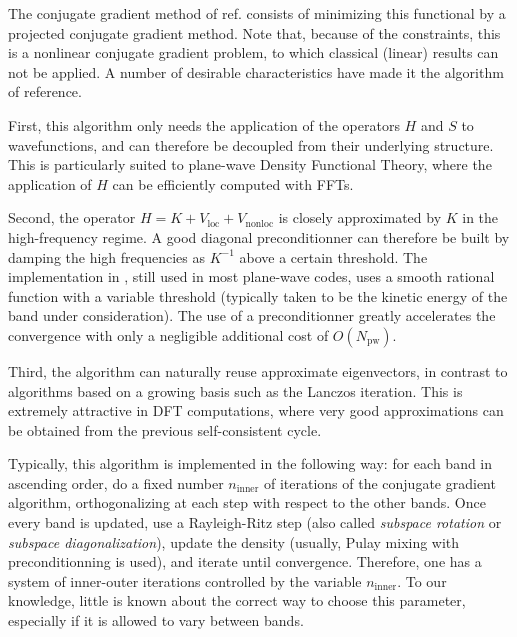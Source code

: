 \documentclass[11pt]{elsarticle}
\newcommand{\npw}{\ensuremath{N_{\text{pw}}}\xspace}
\newcommand{\nline}{\ensuremath{n_{\text{inner}}}\xspace}
\begin{document}
The conjugate gradient method of ref. \cite{payne1992iterative,
  kresse1996efficient} consists of minimizing this functional by a
projected conjugate gradient method. Note that, because of the
constraints, this is a nonlinear conjugate gradient problem, to which
classical (linear) results can not be applied. A number of desirable
characteristics have made it the algorithm of reference.

First, this algorithm only needs the application of the operators $H$
and $S$ to wavefunctions, and can therefore be decoupled from their
underlying structure. This is particularly suited to plane-wave
Density Functional Theory, where the application of $H$ can be
efficiently computed with FFTs.

Second, the operator $H = K + V_{\text{loc}} + V_{\text{nonloc}}$ is
closely approximated by $K$ in the high-frequency regime. A good
diagonal preconditionner can therefore be built by damping the high
frequencies as $K^{-1}$ above a certain threshold. The implementation
in \cite{payne1992iterative, kresse1996efficient}, still used in most
plane-wave codes, uses a smooth rational function with a variable
threshold (typically taken to be the kinetic energy of the band under
consideration). The use of a preconditionner greatly accelerates the
convergence with only a negligible additional cost of $O(\npw)$.

Third, the algorithm can naturally reuse approximate eigenvectors, in
contrast to algorithms based on a growing basis such as the Lanczos
iteration. This is extremely attractive in DFT computations, where
very good approximations can be obtained from the previous self-consistent cycle.

Typically, this algorithm is implemented in the following way: for
each band in ascending order, do a fixed number \nline of iterations
of the conjugate gradient algorithm, orthogonalizing at each step with
respect to the other bands. Once every band is updated, use a
Rayleigh-Ritz step (also called \textit{subspace rotation} or
\textit{subspace diagonalization}), update the density (usually, Pulay
mixing with preconditionning is used), and iterate until
convergence. Therefore, one has a system of inner-outer iterations
controlled by the variable \nline. To our knowledge, little is known
about the correct way to choose this parameter, especially if it is
allowed to vary between bands.
\end{document}

